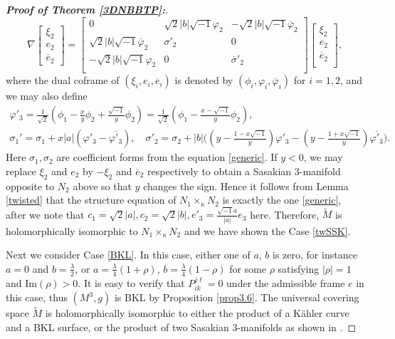 \documentclass{amsart}
\numberwithin{equation}{section}
\theoremstyle{definition}
\renewcommand{\1}{\mathds{1}}
\renewcommand{\>}{\rightarrow}
\begin{document}
\begin{proof}[{\bf Proof of Theorem \ref{3DNBBTP}:}]
\[ \nabla \! \begin{bmatrix} \xi_2 \\ e_2 \\ \overline{e}_2 \end{bmatrix}=
\begin{bmatrix} 0 & \sqrt{2}|b| \sqrt{-1} \varphi_2 & - \sqrt{2}|b| \sqrt{-1} \overline{\varphi}_2 \\
\sqrt{2}|b| \sqrt{-1} \overline{\varphi}_2 & \sigma'_2 & 0  \\
-\sqrt{2}|b| \sqrt{-1} \varphi_2  & 0 & \overline{\sigma}'_2  \\ \end{bmatrix}\!\!
\begin{bmatrix} \xi_2 \\ e_2 \\ \overline{e}_2 \\ \end{bmatrix}\!\!,\]
where the dual coframe of $(\xi_i,e_i,\overline{e}_i)$ is denoted by $(\phi_i,\varphi_i,\overline{\varphi}_i)$ for $i=1,2$, and we may also define
\begin{gather*}
\varphi'_3 = \frac{1}{\sqrt{2}}(\phi_1 - \frac{x}{y} \phi_2 + \frac{\sqrt{-1}}{y} \phi_2 ) =  \frac{1}{\sqrt{2}}(\phi_1 - \frac{x-\sqrt{-1}}{y} \phi_2 ),\\
\sigma_1'= \sigma_1 + x|a|(\varphi'_3 - \overline{\varphi'_3}),\quad \sigma'_2 = \sigma_2 + |b| \big( (y- \frac{1-x\sqrt{-1}}{y}) \varphi'_3 - (y-\frac{1+x\sqrt{-1}}{y}) \overline{\varphi'_3} \big).
\end{gather*}
Here $\sigma_1, \sigma_2$ are coefficient forms from the equation \eqref{generic}. If $y<0$, we may replace $\xi_2$ and $e_2$ by $-\xi_2$ and $\overline{e}_2$ respectively to obtain a Sasakian 3-manifold opposite to $N_2$ above
so that $y$ changes the sign. Hence it follows from Lemma \ref{twisted} that the structure equation of $N_1 \times_{\kappa} N_2$ is exactly the one \eqref{generic},
after we note that $c_1 = \sqrt{2}|a|, c_2 = \sqrt{2}|b|, e'_3=\frac{\sqrt{-1} \overline{a}}{|a|}e_3$ here. Therefore, $\widetilde{M}$ is holomorphically isomorphic to $N_1 \times_{\kappa} N_2$ and we have shown the Case \eqref{twSSK}.

Next we consider Case \eqref{BKL}. In this case, either one of $a$, $b$ is zero, for instance $a=0$ and $b=\frac{\lambda}{2}$, or $a=\frac{\lambda}{4}(1+\rho)$, $b=\frac{\lambda}{4}(1-\rho)$ for some $\rho$ satisfying $|\rho|=1$ and $\mathrm{Im}(\rho)>0$.
It is easy to verify that $P_{ik}^{j \ell}=0$ under the admissible frame $e$ in this case, thus $(M^3,g)$ is BKL by Proposition \ref{prop3.6}.
The universal covering space $\widetilde{M}$ is holomorphically isomorphic to either the product of a K\"ahler curve and a BKL surface, or the product of two Sasakian $3$-manifolds as shown in \cite[Theorem 7]{YZZ}.


\end{proof}
\end{document}
